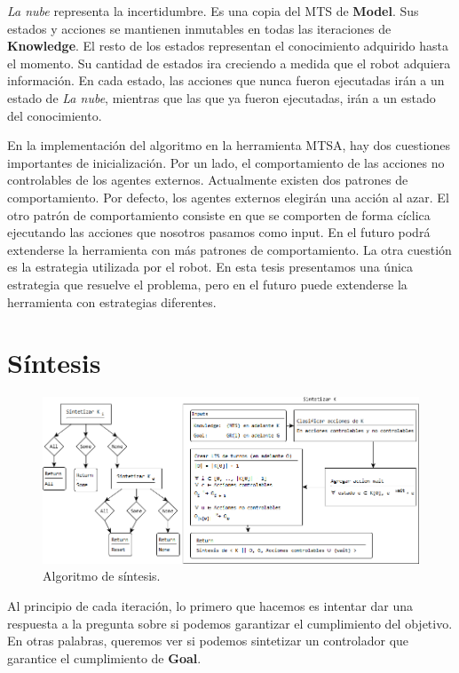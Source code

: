 \vspace{\baselineskip}
\textit{La nube} representa la incertidumbre. Es una copia del MTS de \textbf{Model}. Sus estados y acciones se mantienen inmutables en todas las 
iteraciones de \textbf{Knowledge}.
El resto de los estados representan el conocimiento adquirido hasta el momento. Su cantidad de estados ira creciendo a medida que el robot adquiera información.
En cada estado, las acciones que nunca fueron ejecutadas irán a un estado de \textit{La nube}, mientras que las que ya fueron ejecutadas, irán a un estado del
conocimiento.

\vspace{\baselineskip}
En la implementación del algoritmo en la herramienta MTSA, hay dos cuestiones importantes de inicialización.
Por un lado, el comportamiento de las acciones no controlables de los agentes externos. Actualmente existen dos patrones de comportamiento.
Por defecto, los agentes externos elegirán una acción al azar. El otro patrón de comportamiento consiste en que se comporten de forma cíclica ejecutando
las acciones que nosotros pasamos como input. En el futuro podrá extenderse la herramienta con más patrones de comportamiento.
La otra cuestión es la estrategia utilizada por el robot. En esta tesis presentamos una única estrategia que resuelve el problema, pero en el futuro puede
extenderse la herramienta con estrategias diferentes.

\section{Síntesis}

\begin{figure}[H]
  \centering
    \includegraphics[width=1.0\textwidth]{Imagenes/Algoritmo/Algoritmo_sintetizar.png}
  \caption{Algoritmo de síntesis.}
  \label{fig:Algoritmo_sintetizar}
\end{figure}

Al principio de cada iteración, lo primero que hacemos es intentar dar una respuesta a la pregunta sobre si podemos garantizar el cumplimiento del objetivo.
En otras palabras, queremos ver si podemos sintetizar un controlador que garantice el cumplimiento de \textbf{Goal}.

